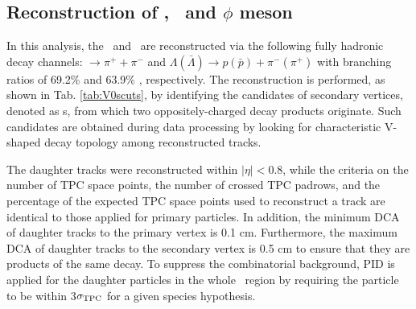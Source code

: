 \documentclass[ALICE,manyauthors]{cernphprep}
\begin{document}
\subsection{Reconstruction of \Ks, \lambdas~and $\phi$ meson}
\label{SubSec:K0sLambdaPhiRec}



In this analysis, the \Ks~and \lambdas~are reconstructed via the following fully hadronic decay channels: \Ks $\rightarrow \pi^{+} + \pi^{-}$ and  $\Lambda(\bar{\Lambda})\rightarrow p(\bar{p})+\pi^{-}(\pi^{+})$ with branching ratios of 69.2\% and 63.9\% \cite{Olive_2016}, respectively. The reconstruction is performed, as shown in Tab. \ref{tab:V0scuts}, by identifying the candidates of secondary vertices, denoted as \vo s, from which two oppositely-charged decay products originate. Such candidates are obtained during data processing by looking for characteristic V-shaped decay topology among reconstructed tracks.

The daughter tracks were reconstructed within $|\eta|<0.8$, while the criteria on the number of TPC space points, the number of crossed TPC padrows, and the percentage of the expected TPC space points used to reconstruct a track are identical to those applied for primary particles. In addition, the minimum DCA of daughter tracks to the primary vertex is 0.1 cm. Furthermore, the maximum DCA of daughter tracks to the secondary vertex is 0.5 cm to ensure that they are products of the same decay. To suppress the combinatorial background, PID is applied for the daughter particles in the whole \pT~region by requiring the particle to be within 3$\sigma_{\rm TPC}$ for a given species hypothesis.
\end{document}
